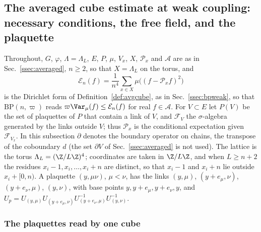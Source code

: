 \subsection{The averaged cube estimate at weak coupling: necessary
conditions, the free field, and the plaquette}\label{rD:sec}

Throughout, $G$, $\varphi$, $\Lambda=\Lambda_L$, $E$, $P$, $\mu$, $V_x$,
$X$, $\mathcal P_x$ and $\mathcal A$ are as in Sec.~\ref{ssec:averaged},
$n\ge2$, so that $X=\Lambda_L$ on the torus, and
\[
\mathcal E_n(f)=\frac1{n^4}\sum_{x\in X}\mu\bigl((f-\mathcal P_xf)^2\bigr)
\]
is the Dirichlet form of Definition~\ref{def:avgcube}, as in
Sec.~\ref{ssec:bpweak}, so that $\mathrm{BP}(n,\varpi)$ reads
$\varpi\Var_\mu(f)\le\mathcal E_n(f)$ for real $f\in\mathcal A$. For
$V\subset E$ let $P(V)$ be the set of plaquettes of $P$ that contain a link
of $V$, and $\mathcal F_V$ the $\sigma$-algebra generated by the links
outside $V$; thus $\mathcal P_x$ is the conditional expectation given
$\mathcal F_{V_x}$. In this subsection $\partial$ denotes the boundary
operator on chains, the transpose of the coboundary $d$ (the set
$\partial V$ of Sec.~\ref{ssec:averaged} is not used). The lattice is the torus
$\Lambda_L=(\Z/L\Z)^4$; coordinates are taken in $\Z/L\Z$, and when
$L\ge n+2$ the residues $x_i-1,x_i,\dots,x_i+n$ are distinct, so that
$x_i-1$ and $x_i+n$ lie outside $x_i+[0,n)$. A plaquette $(y,\mu\nu)$,
$\mu<\nu$, has the links $(y,\mu)$, $(y+e_\mu,\nu)$, $(y+e_\nu,\mu)$,
$(y,\nu)$, with base points $y,y+e_\mu,y+e_\nu,y$, and
$U_p=U_{(y,\mu)}U_{(y+e_\mu,\nu)}U_{(y+e_\nu,\mu)}^{-1}U_{(y,\nu)}^{-1}$.

\subsubsection{The plaquettes read by one cube}

